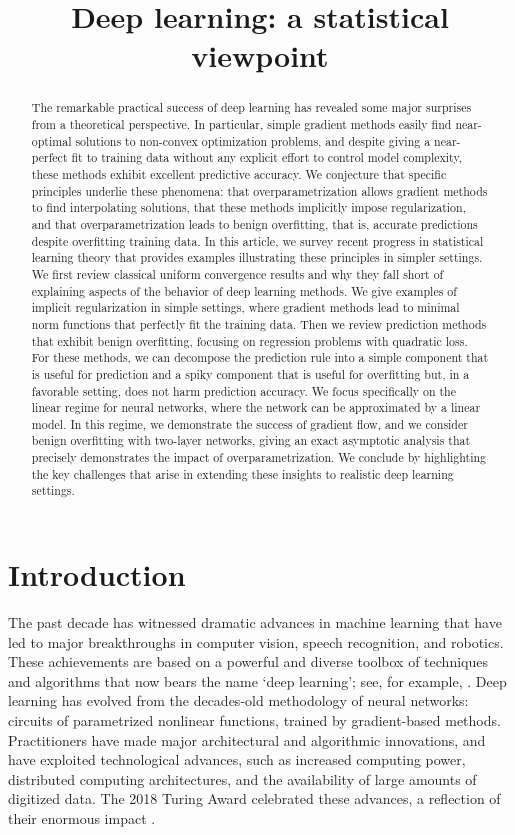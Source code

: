 \title{Deep learning: a statistical viewpoint}

\begin{abstract}
The remarkable practical success of deep learning has revealed some major surprises from a theoretical perspective.  In particular, simple gradient methods easily find near-optimal solutions to non-convex optimization problems, and despite giving a near-perfect fit to training data without any explicit effort to control model complexity, these methods exhibit excellent predictive accuracy. We conjecture that specific principles underlie these phenomena: that overparametrization allows gradient methods to find interpolating solutions, that these methods implicitly impose regularization, and that overparametrization leads to benign overfitting, that is, accurate predictions despite overfitting training data.  In this article, we survey recent progress in statistical learning theory that provides examples illustrating these principles in simpler settings.  We first review classical uniform convergence results and why they fall short of explaining aspects of the behavior of deep learning methods.  We give examples of implicit regularization in simple settings, where gradient methods lead to minimal norm functions that perfectly fit the training data.  Then we review prediction methods that exhibit benign overfitting, focusing on regression problems with quadratic loss.  For these methods, we can decompose the prediction rule into a simple component that is useful for prediction and a spiky component that is useful for overfitting but, in a favorable setting, does not harm prediction accuracy.  We focus specifically on the linear regime for neural networks, where the network can be approximated by a linear model. In this regime, we demonstrate the success of gradient flow, and we consider benign overfitting with two-layer networks, giving an exact asymptotic analysis that precisely demonstrates the impact of overparametrization.  We conclude by highlighting the key challenges that arise in extending these insights to realistic deep learning settings.
\end{abstract}

\section{Introduction}\label{sec:intro}

The past decade has witnessed dramatic advances in machine learning that have led to major breakthroughs in computer vision, speech recognition, and robotics.  These achievements are based on a powerful and diverse toolbox of techniques and algorithms that now bears the name `deep learning'; see, for example, \cite{gbc-dl-16}. Deep learning has evolved from the decades-old methodology of neural networks: circuits of parametrized nonlinear functions, trained by gradient-based methods. Practitioners have made major architectural and algorithmic innovations, and have exploited technological advances, such as increased computing power, distributed computing architectures, and the availability of large amounts of digitized data. The 2018 Turing Award celebrated these advances, a reflection of their enormous impact \cite{lbh-dl-15}.

